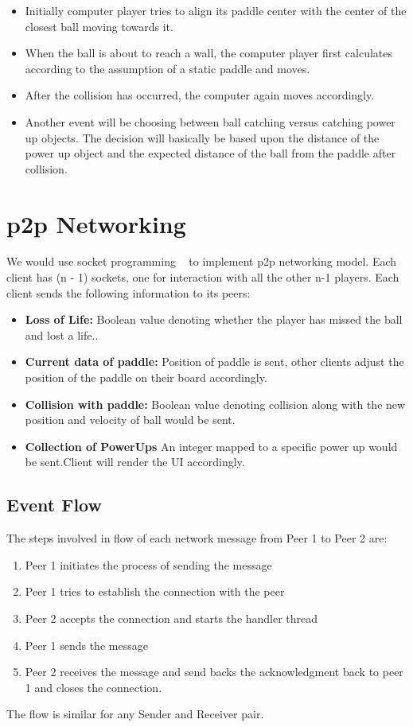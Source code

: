 \documentclass{article}
\begin{document}
			\begin{itemize}
			\item Initially computer player tries to align its paddle center with the center of the closest ball moving towards it.
			\item When the ball is about to reach a wall, the computer player first calculates according to the assumption of a static paddle and moves.
			\item After the collision has occurred, the computer again moves accordingly.
			\item Another event will be choosing between ball catching versus catching power up objects. The decision will basically be based upon the distance of the power up object and the expected distance of the ball from the paddle after collision.
			\end{itemize}

			\section{p2p Networking}
			\par\noindent We would use socket programming ~\cite{socket_java} to implement p2p networking model. Each client has (n - 1) sockets, one for interaction with all the other n-1 players. Each client sends the following information to its peers:
			\begin{itemize}
			\item \textbf{Loss of Life:} Boolean value denoting whether the player has missed the ball and lost a life..
			\item \textbf{Current data of paddle:} Position of paddle is sent,  other clients adjust the position of the paddle on their board accordingly. 
			\item \textbf{Collision with paddle:} Boolean value denoting collision along with the new position and velocity of ball would be sent.
			\item \textbf{Collection of PowerUps} An integer mapped to a specific power up would be sent.Client will render the UI accordingly.
			\end{itemize}
			\subsection{Event Flow}
			The steps involved in flow of each network message from Peer 1 to Peer 2 are:
			\begin{enumerate}
			\item Peer 1 initiates the process of sending the message
			\item Peer 1 tries to establish the connection with the peer
			\item Peer 2 accepts the connection and starts the handler thread
			\item Peer 1 sends the message
			\item Peer 2 receives the message and send backs the acknowledgment back to peer 1 and closes the connection.
			\end{enumerate}
			The flow is similar for any Sender and Receiver pair.
\end{document}
